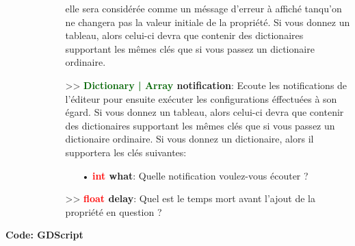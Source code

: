 \documentclass[a4paper, 11pt]{article}
\begin{document}
\begin{description}
\begin{itemize}
\begin{itemize}
				elle sera considérée comme un méssage d'erreur à affiché tanqu'on ne changera pas la valeur
				initiale de la propriété. Si vous donnez un tableau, alors celui-ci devra que contenir des
				dictionaires supportant les mêmes clés que si vous passez un dictionaire ordinaire.\\
				\item[>> \textbf{\textcolor{darkgreen}{Dictionary | Array} notification}:] Ecoute les 
				notifications de l'éditeur pour ensuite exécuter les configurations éffectuées à son égard. 
				Si vous donnez un tableau, alors celui-ci devra que contenir des dictionaires supportant les 
				mêmes clés que si vous passez un dictionaire ordinaire. Si vous donnez un dictionaire, alors 
				il supportera les clés suivantes:
				\begin{itemize}
					\item[• \textbf{\textcolor{red}{int} what}:] Quelle notification voulez-vous écouter ?\\
				\end{itemize}
				\item[>> \textbf{\textcolor{red}{float} delay}:] Quel est le temps mort avant l'ajout de la 
				propriété en question ?\\
			\end{itemize}
		\end{itemize}
	\end{description}
	\textbf{Code: GDScript}
\end{document}
